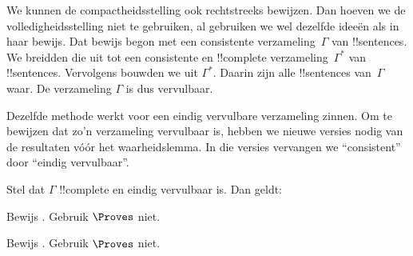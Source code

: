 \documentclass[../../../include/open-logic-section]{subfiles}
\begin{document}
      {}
      {}


We kunnen de compactheidsstelling ook rechtstreeks bewijzen. Dan hoeven
we de volledigheidsstelling niet te gebruiken, al gebruiken we wel
dezelfde ideeën als in haar bewijs. Dat bewijs begon met een consistente
verzameling~$\Gamma$ van !!{sentence}s. We breidden die uit tot een
consistente en !!{complete}
verzameling~$\Gamma^*$ van !!{sentence}s. Vervolgens bouwden we
uit $\Gamma^*$. Daarin zijn alle !!{sentence}s van~$\Gamma$ waar. De
verzameling $\Gamma$ is dus vervulbaar.

Dezelfde methode werkt voor een eindig vervulbare verzameling zinnen. Om
te bewijzen dat zo'n verzameling vervulbaar is, hebben we nieuwe versies
nodig van de resultaten vóór het waarheidslemma. In die versies vervangen
we ``consistent'' door ``eindig vervulbaar''.

\begin{prop}
Stel dat $\Gamma$ !!{complete} en eindig vervulbaar is. Dan geldt:
\begin{enumerate}


\end{enumerate}
\end{prop}

\begin{prob}
Bewijs . Gebruik $\Proves$ niet.
\end{prob}
\tagendprob

\begin{prob}
Bewijs . Gebruik $\Proves$ niet.
\end{prob}
\tagendprob

\end{document}
